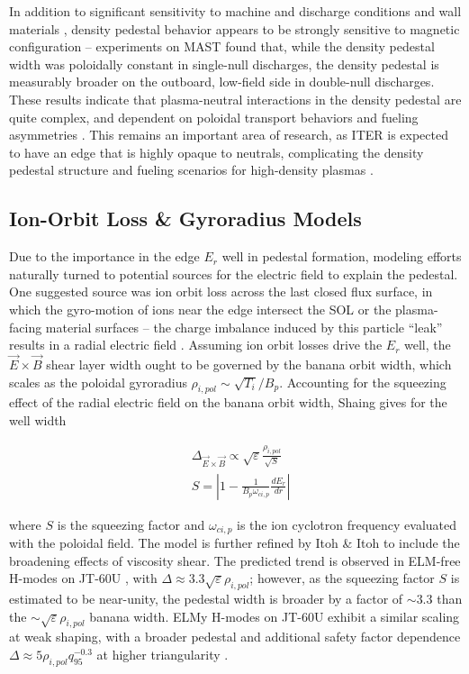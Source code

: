 In addition to significant sensitivity to machine and discharge conditions and wall materials \cite{Beurskens2011}, density pedestal behavior appears to be strongly sensitive to magnetic configuration -- experiments on MAST \cite{Maggi2010} found that, while the density pedestal width was poloidally constant in single-null discharges, the density pedestal is measurably broader on the outboard, low-field side in double-null discharges.  These results indicate that plasma-neutral interactions in the density pedestal are quite complex, and dependent on poloidal transport behaviors and fueling asymmetries \cite{Maggi2010}.  This remains an important area of research, as ITER is expected to have an edge that is highly opaque to neutrals, complicating the density pedestal structure and fueling scenarios for high-density plasmas \cite{Hughes2007,Maggi2010}.

\subsection{Ion-Orbit Loss \& Gyroradius Models}\label{subsec:mod_ionorbitloss}

Due to the importance in the edge $E_r$ well in pedestal formation, modeling efforts naturally turned to potential sources for the electric field to explain the pedestal.  One suggested source was ion orbit loss across the last closed flux surface, in which the gyro-motion of ions near the edge intersect the SOL or the plasma-facing material surfaces -- the charge imbalance induced by this particle ``leak'' results in a radial electric field \cite{Shaing1990}.  Assuming ion orbit losses drive the $E_r$ well, the $\vec{E}\times\vec{B}$ shear layer width ought to be governed by the banana orbit width, which scales as the poloidal gyroradius $\rho_{i,pol} \sim \sqrt{T_i}/B_p$.  Accounting for the squeezing effect of the radial electric field on the banana orbit width, Shaing \cite{Shaing1992} gives for the well width

\begin{equation}\label{eq:Shaing_width}
 \begin{aligned}
  &\Delta_{\vec{E}\times\vec{B}} \propto \sqrt{\varepsilon} \frac{\rho_{i,pol}}{\sqrt{S}}\\
  &S = \left| 1 - \frac{1}{B_p \omega_{ci,p}} \frac{dE_r}{dr}\right|
 \end{aligned}
\end{equation}

\noindent where $S$ is the squeezing factor and $\omega_{ci,p}$ is the ion cyclotron frequency evaluated with the poloidal field.  The model is further refined by Itoh \& Itoh \cite{Itoh1996} to include the broadening effects of viscosity shear.  The predicted trend is observed in ELM-free H-modes on JT-60U \cite{Hatae1998}, with $\Delta \approx 3.3 \sqrt{\varepsilon} \rho_{i,pol}$; however, as the squeezing factor $S$ is estimated to be near-unity, the pedestal width is broader by a factor of $\sim 3.3$ than the $\sim \sqrt{\varepsilon} \rho_{i,pol}$ banana width.  ELMy H-modes on JT-60U exhibit a similar scaling at weak shaping, with a broader pedestal and additional safety factor dependence $\Delta \approx 5 \rho_{i,pol} q_{95}^{-0.3}$ at higher triangularity \cite{Kamada1999}.

